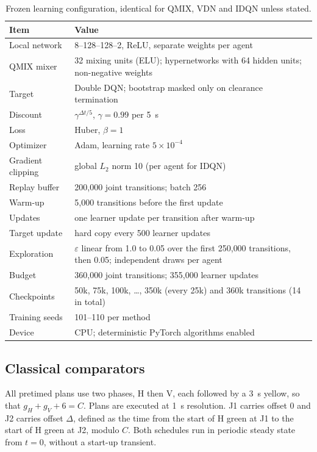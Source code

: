 \documentclass[review,12pt]{elsarticle}
\begin{document}
\begin{table}[!htbp]
\centering
\caption{Frozen learning configuration, identical for QMIX, VDN and IDQN
unless stated.}
\label{tab:hyperparameters}
\small
\begin{tabularx}{\textwidth}{@{}L{5.6cm}Y@{}}
\toprule
Item & Value \\
\midrule
Local network & 8--128--128--2, ReLU, separate weights per agent \\
QMIX mixer & 32 mixing units (ELU); hypernetworks with 64 hidden units; non-negative weights \\
Target & Double DQN; bootstrap masked only on clearance termination \\
Discount & $\gamma^{\Delta t/5}$, $\gamma=0.99$ per 5~s \\
Loss & Huber, $\beta=1$ \\
Optimizer & Adam, learning rate $5\times10^{-4}$ \\
Gradient clipping & global $L_2$ norm 10 (per agent for IDQN) \\
Replay buffer & 200{,}000 joint transitions; batch 256 \\
Warm-up & 5{,}000 transitions before the first update \\
Updates & one learner update per transition after warm-up \\
Target update & hard copy every 500 learner updates \\
Exploration & $\varepsilon$ linear from 1.0 to 0.05 over the first 250{,}000 transitions, then 0.05; independent draws per agent \\
Budget & 360{,}000 joint transitions; 355{,}000 learner updates \\
Checkpoints & 50k, 75k, 100k, \ldots, 350k (every 25k) and 360k transitions (14 in total) \\
Training seeds & 101--110 per method \\
Device & CPU; deterministic PyTorch algorithms enabled \\
\bottomrule
\end{tabularx}
\end{table}

\subsection{Classical comparators}
\label{subsec:classical}

All pretimed plans use two phases, H then V, each followed by a 3~s
yellow, so that $g_H+g_V+6=C$. Plans are executed at 1~s resolution.
J1 carries offset 0 and J2 carries offset $\Delta$, defined as the time
from the start of H green at J1 to the start of H green at J2, modulo
$C$. Both schedules run in periodic steady state from $t=0$, without a
start-up transient.
\end{document}
